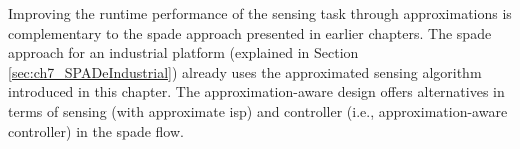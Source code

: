 Improving the runtime performance of the sensing task through approximations is complementary to the \gls{spade} approach presented in earlier chapters. 
The \gls{spade} approach for an industrial platform (explained in Section \ref{sec:ch7_SPADeIndustrial}) already uses the approximated sensing algorithm introduced in this chapter. The approximation-aware design offers alternatives in terms of sensing (with approximate \gls{isp}) and controller (i.e., approximation-aware controller) in the \gls{spade} flow.